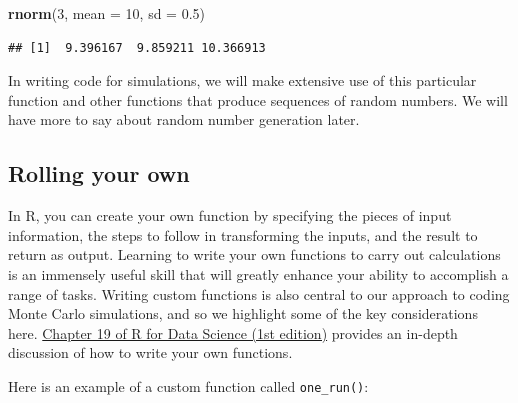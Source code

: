 \documentclass[
]{book}
\newenvironment{Shaded}{\begin{snugshade}}{\end{snugshade}}
\newcommand{\AttributeTok}[1]{\textcolor[rgb]{0.13,0.29,0.53}{#1}}
\newcommand{\ControlFlowTok}[1]{\textcolor[rgb]{0.13,0.29,0.53}{\textbf{#1}}}
\newcommand{\DecValTok}[1]{\textcolor[rgb]{0.00,0.00,0.81}{#1}}
\newcommand{\FloatTok}[1]{\textcolor[rgb]{0.00,0.00,0.81}{#1}}
\newcommand{\FunctionTok}[1]{\textcolor[rgb]{0.13,0.29,0.53}{\textbf{#1}}}
\newcommand{\NormalTok}[1]{#1}
\newcommand{\OtherTok}[1]{\textcolor[rgb]{0.56,0.35,0.01}{#1}}
\newcommand{\SpecialCharTok}[1]{\textcolor[rgb]{0.81,0.36,0.00}{\textbf{#1}}}
\begin{document}
\begin{Shaded}
\begin{Highlighting}[]
\FunctionTok{rnorm}\NormalTok{(}\DecValTok{3}\NormalTok{, }\AttributeTok{mean =} \DecValTok{10}\NormalTok{, }\AttributeTok{sd =} \FloatTok{0.5}\NormalTok{)}
\end{Highlighting}
\end{Shaded}

\begin{verbatim}
## [1]  9.396167  9.859211 10.366913
\end{verbatim}

In writing code for simulations, we will make extensive use of this particular function and other functions that produce sequences of random numbers.
We will have more to say about random number generation later.

\subsection{Rolling your own}\label{rolling-your-own}

In R, you can create your own function by specifying the pieces of input information, the steps to follow in transforming the inputs, and the result to return as output.
Learning to write your own functions to carry out calculations is an immensely useful skill that will greatly enhance your ability to accomplish a range of tasks.
Writing custom functions is also central to our approach to coding Monte Carlo simulations, and so we highlight some of the key considerations here.
\href{https://r4ds.had.co.nz/functions.html}{Chapter 19 of R for Data Science (1st edition)} provides an in-depth discussion of how to write your own functions.

Here is an example of a custom function called \texttt{one\_run()}:

\begin{Shaded}
\end{Shaded}
\end{document}
